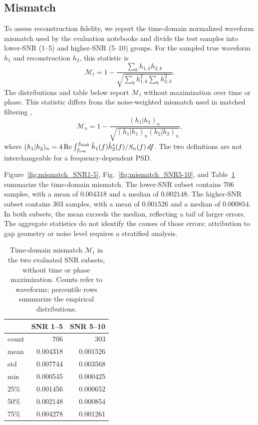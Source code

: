 \documentclass[prd,aps,a4paper,twocolumn,superscriptaddress,nofootinbib,floatfix]{revtex4-2}
\begin{document}
\subsection{Mismatch}\label{subsec:Mismatch}
To assess reconstruction fidelity, we report the time-domain normalized waveform mismatch used by the evaluation notebooks and divide the test samples into lower-SNR (1--5) and higher-SNR (5--10) groups. For the sampled true waveform $h_1$ and reconstruction $h_2$, this statistic is
\begin{equation}
\label{formula:mismatch}
\mathcal{M}_{t}=1-\frac{\sum_k h_{1,k}h_{2,k}}{\sqrt{\sum_k h_{1,k}^{2}\sum_k h_{2,k}^{2}}}.
\end{equation}
The distributions and table below report $\mathcal{M}_{t}$ without maximization over time or phase. This statistic differs from the noise-weighted mismatch used in matched filtering \cite{Cutler_1994},
\begin{equation}
\mathcal{M}_{n}=1-\frac{(h_1|h_2)_n}{\sqrt{(h_1|h_1)_n(h_2|h_2)_n}},
\end{equation}
where $(h_1|h_2)_n=4\,\mathrm{Re}\int_{f_{\rm low}}^{f_{\rm high}}\tilde h_1(f)\tilde h_2^*(f)/S_n(f)\,df$. The two definitions are not interchangeable for a frequency-dependent PSD.

Figure~\ref{fig:mismatch_SNR1-5}, Fig.~\ref{fig:mismatch_SNR5-10}, and Table~\ref{table:mismatch} summarize the time-domain mismatch. The lower-SNR subset contains 706 samples, with a mean of $0.004318$ and a median of $0.002148$. The higher-SNR subset contains 303 samples, with a mean of $0.001526$ and a median of $0.000854$. In both subsets, the mean exceeds the median, reflecting a tail of larger errors. The aggregate statistics do not identify the causes of those errors; attribution to gap geometry or noise level requires a stratified analysis.

\begin{table}[ht]
\centering
\caption{Time-domain mismatch $\mathcal M_t$ in the two evaluated SNR subsets, without time or phase maximization. Counts refer to waveforms; percentile rows summarize the empirical distributions.}
\label{table:mismatch}
\begin{tabular}{lrr}
\toprule
  & SNR 1–5   & SNR 5–10  \\
\midrule
count   & 706   & 303 \\
mean    & 0.004318  & 0.001526  \\
std     & 0.007744  & 0.003568  \\
min     & 0.000545  & 0.000425  \\
25\%    & 0.001456  & 0.000652  \\
50\%    & 0.002148  & 0.000854  \\
75\%    & 0.004278  & 0.001261  \\
\bottomrule
\end{tabular}
\end{table}
\end{document}
